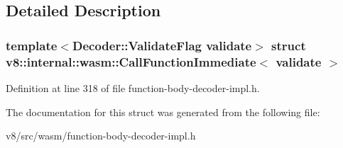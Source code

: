 \subsection{Detailed Description}
\subsubsection*{template$<$Decoder\+::\+Validate\+Flag validate$>$\newline
struct v8\+::internal\+::wasm\+::\+Call\+Function\+Immediate$<$ validate $>$}



Definition at line 318 of file function-\/body-\/decoder-\/impl.\+h.



The documentation for this struct was generated from the following file\+:\begin{DoxyCompactItemize}
\item 
v8/src/wasm/function-\/body-\/decoder-\/impl.\+h\end{DoxyCompactItemize}
